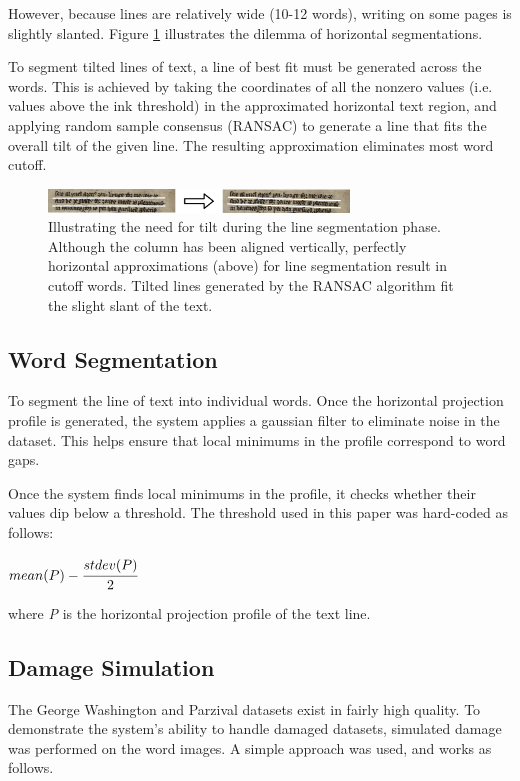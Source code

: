 \documentclass[final]{ukthesis}
\begin{document}
However, because lines are relatively wide (10-12 words), writing on some pages is slightly slanted. Figure \ref{fig:flat-vs-tilted} illustrates the dilemma of horizontal segmentations.

To segment tilted lines of text, a line of best fit must be generated across the words. This is achieved by taking the coordinates of all the nonzero values (i.e. values above the ink threshold) in the approximated horizontal text region, and applying random sample consensus (RANSAC) \cite{fischler1987random} to generate a line that fits the overall tilt of the given line. The resulting approximation eliminates most word cutoff.

\begin{figure}[t]
\begin{center}
\includegraphics[width=8cm]{flat-vs-tilted}
\end{center}
\caption{Illustrating the need for tilt during the line segmentation phase. Although the column has been aligned vertically, perfectly horizontal approximations (above) for line segmentation result in cutoff words. Tilted lines generated by the RANSAC algorithm fit the slight slant of the text.}
\label{fig:flat-vs-tilted}
\end{figure}


\subsection{Word Segmentation}
To segment the line of text into individual words. Once the horizontal projection profile is generated, the system applies a gaussian filter to eliminate noise in the dataset. This helps ensure that local minimums in the profile correspond to word gaps.

Once the system finds local minimums in the profile, it checks whether their values dip below a threshold. The threshold used in this paper was hard-coded as follows:

\begin{center}
\begin{math}
mean(P) - \cfrac{stdev(P)}{2}
\end{math}
\end{center}

where {\em P} is the horizontal projection profile of the text line.


\subsection{Damage Simulation}
The George Washington and Parzival datasets exist in fairly high quality. To demonstrate the system's ability to handle damaged datasets, simulated damage was performed on the word images. A simple approach was used, and works as follows.
\end{document}
